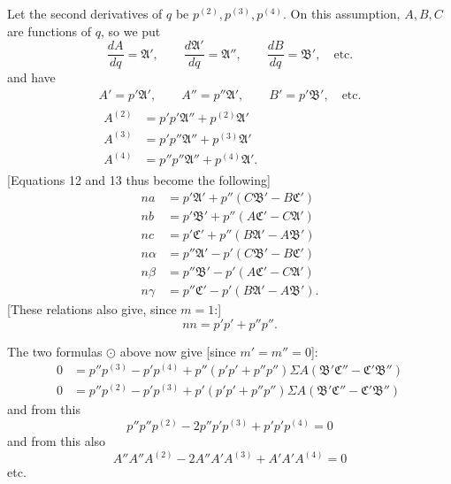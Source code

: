 \par{}%
Let the second derivatives of $q$ be $p^{(2)},p^{(3)},p^{(4)}$. On this assumption, $A,B,C$ are functions of $q$, so we put
\[
\frac{dA}{dq}=\mathfrak{A}',\qquad\frac{d\mathfrak{A}'}{dq}=\mathfrak{A}'',\qquad\frac{dB}{dq}=\mathfrak{B}',\quad\text{etc.}
\]
and have
\[
\begin{gathered}
A'=p'\mathfrak{A}',\qquad A''=p''\mathfrak{A}',\qquad B'=p'\mathfrak{B}',\quad\text{etc.}\\
\begin{aligned}
A^{(2)}&=p'p'\mathfrak{A}''+p^{(2)}\mathfrak{A}'\\
A^{(3)}&=p'p''\mathfrak{A}''+p^{(3)}\mathfrak{A}'\\
A^{(4)}&=p''p''\mathfrak{A}''+p^{(4)}\mathfrak{A}'.
\end{aligned}
\end{gathered}
\]
[Equations 12 and 13 thus become the following]
\[
\begin{aligned}
na&=p'\mathfrak{A}'+p''(C\mathfrak{B}'-B\mathfrak{C}')\\
nb&=p'\mathfrak{B}'+p''(A\mathfrak{C}'-C\mathfrak{A}')\\
nc&=p'\mathfrak{C}'+p''(B\mathfrak{A}'-A\mathfrak{B}')\\[4pt]
n\alpha&=p''\mathfrak{A}'-p'(C\mathfrak{B}'-B\mathfrak{C}')\\
n\beta&=p''\mathfrak{B}'-p'(A\mathfrak{C}'-C\mathfrak{A}')\\
n\gamma&=p''\mathfrak{C}'-p'(B\mathfrak{A}'-A\mathfrak{B}').
\end{aligned}
\]
[These relations also give, since $m=1$:]
\[
nn=p'p'+p''p''.
\]
\par\indent The two formulas $\odot$ above now give [since $m'=m''=0$]:
\[
\begin{aligned}
0&=p''p^{(3)}-p'p^{(4)}+p''(p'p'+p''p'')\Sigma A(\mathfrak{B}'\mathfrak{C}''-\mathfrak{C}'\mathfrak{B}'')\\
0&=p''p^{(2)}-p'p^{(3)}+p'(p'p'+p''p'')\Sigma A(\mathfrak{B}'\mathfrak{C}''-\mathfrak{C}'\mathfrak{B}'')
\end{aligned}
\]
and from this
\[
p''p''p^{(2)}-2p''p'p^{(3)}+p'p'p^{(4)}=0
\]
and from this also
\[
A''A''A^{(2)}-2A''A'A^{(3)}+A'A'A^{(4)}=0
\]
etc.

